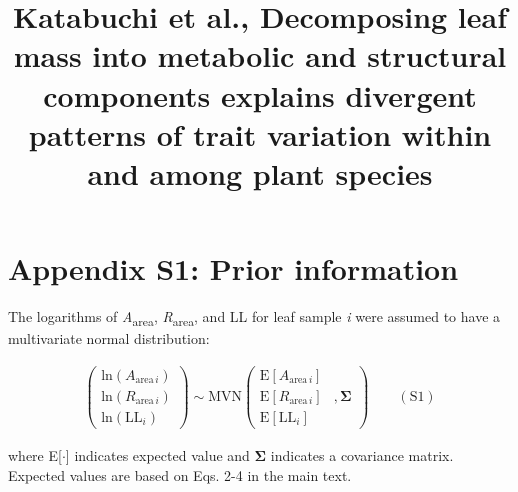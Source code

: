 \documentclass[
  12pt,
  letterpaper,
  DIV=11,
  numbers=noendperiod]{scrartcl}
\title{Katabuchi et al., Decomposing leaf mass into metabolic and
structural components explains divergent patterns of trait variation
within and among plant species}
\author{}
\date{}
\renewcommand*\contentsname{Table of contents}
\newcommand\contentsname{Table of contents}
\begin{document}
\maketitle

\renewcommand*\contentsname{Table of contents}
{
\hypersetup{linkcolor=}
\setcounter{tocdepth}{3}
\tableofcontents
}
\newpage

\section{Appendix S1: Prior
information}\label{appendix-s1-prior-information}

The logarithms of \emph{A}\textsubscript{area},
\emph{R}\textsubscript{area}, and LL for leaf sample \emph{i} were
assumed to have a multivariate normal distribution:

\[
\begin{aligned}
\left(
\begin{array}{ccc}
\mathrm{ln}(A_{\mathrm{area} \, i})\\
\mathrm{ln}(R_{\mathrm{area} \, i}) \\
\mathrm{ln}(\mathrm{LL}_i)
\end{array}
\right)
\sim \mathrm{MVN}
\left(
\begin{array}{rrr}
\mathrm{E}[A_{\mathrm{area} \, i}] & \\
\mathrm{E}[R_{\mathrm{area} \, i}] &, \boldsymbol{\Sigma}\\
\mathrm{E}[\mathrm{LL}_i] &
\end{array}
\right) \qquad(\mathrm{S}1)
\end{aligned}
\]

where E{[}\(\cdot\){]} indicates expected value and
\(\boldsymbol{\Sigma}\) indicates a covariance matrix. Expected values
are based on Eqs. 2-4 in the main text.
\end{document}
